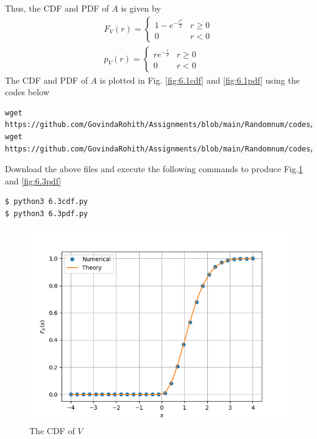 \documentclass[journal,12pt,twocolumn]{IEEEtran}
\renewcommand\thesection{\arabic{section}}
\begin{document}
\begin{enumerate}[label=\thesection.\arabic*
,ref=\thesection.\theenumi]
\begin{enumerate}[label=\thesection.\arabic*
,ref=\thesection.\theenumi]
Thus, the CDF and PDF of $A$ is given by
\begin{align}
	F_V(r) = 
	\begin{cases}
		1 - e^{-\frac{r^2}{2}} & r \geq 0 \\
		0 & r < 0 
	\end{cases} \label{eq:ral-cdf} \\
	p_V(r) = 
	\begin{cases}
		re^{-\frac{r}{2}} & r \geq 0 \\
		0 & r < 0
	\end{cases} \label{eq:ral-pdf} 
\end{align}
The CDF and PDF of $A$ is plotted in Fig. \ref{fig:6.1cdf} and \ref{fig:6.1pdf} using the codes below
\begin{lstlisting}
wget https://github.com/GovindaRohith/Assignments/blob/main/Randomnum/codes/6.3cdf.py
wget https://github.com/GovindaRohith/Assignments/blob/main/Randomnum/codes/6.3pdf.py
\end{lstlisting}
Download the above files and execute the following commands to produce Fig.\ref{fig:6.3cdf} and \ref{fig:6.3pdf}
\begin{lstlisting}
$ python3 6.3cdf.py
$ python3 6.3pdf.py
\end{lstlisting}
\begin{figure}[!h]
\centering
\includegraphics[width=\columnwidth]{./figs/6.3cdf.png}
\caption{The CDF of $V$}
\label{fig:6.3cdf}
\end{figure}
\begin{figure}[!h]
\centering

\end{figure}
\end{enumerate}
\end{enumerate}
\end{document}
